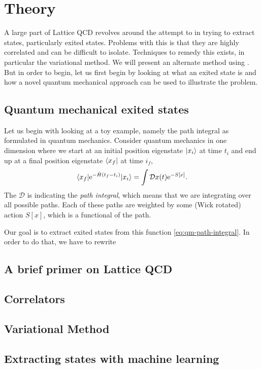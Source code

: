 \section{Theory}
A large part of Lattice QCD revolves around the attempt to in trying to extract states, particularly exited states. Problems with this is that they are highly correlated and can be difficult to isolate. Techniques to remedy this exists, in particular the variational method. We will present an alternate method using . But in order to begin, let us first begin by looking at what an exited state is and how a novel quantum mechanical approach can be used to illustrate the problem.

\subsection{Quantum mechanical exited states}
Let us begin with looking at a toy example, namely the path integral as formulated in quantum mechanics. Consider quantum mechanics in one dimension where we start at an initial position eigenstate $| x_i \rangle$ at time $t_i$ and end up at a final position eigenstate $\langle x_f |$ at time $i_f$,
\begin{align}
    \langle x_f | \mathrm{e}^{-\hat{H}(t_f - t_i)}| x_i \rangle = \int \mathcal{D} x(t) \mathrm{e}^{-S[x]}.
    \label{eq:qm-path-integral}
\end{align}
The $\mathcal{D}$ is indicating the \textit{path integral}, which means that we are integrating over all possible paths\cite{peskin_introduction_1995,shankar_principles_1994}. Each of these paths are weighted by some (Wick rotated) action $S[x]$, which is a functional of the path.

Our goal is to extract exited states from this function \eqref{eq:qm-path-integral}. In order to do that, we have to rewrite 



\subsection{A brief primer on Lattice QCD}

\subsection{Correlators}

\subsection{Variational Method}

\subsection{Extracting states with machine learning}
